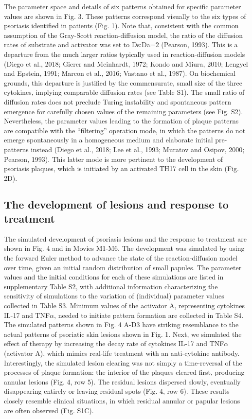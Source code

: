 The parameter space and details of six patterns obtained for specific parameter values are shown in Fig. 3. These patterns correspond visually to the six types of psoriasis identified in patients (Fig. 1). Note that, consistent with the common assumption of the Gray-Scott reaction-diffusion model, the ratio of the diffusion rates of substrate and activator was set to Ds:Da=2 (Pearson, 1993). This is a departure from the much larger ratios typically used in reaction-diffusion models (Diego et al., 2018; Gierer and Meinhardt, 1972; Kondo and Miura, 2010; Lengyel and Epstein, 1991; Marcon et al., 2016; Vastano et al., 1987). On biochemical grounds, this departure is justified by the commensurate, small size of the three cytokines, implying comparable diffusion rates (see Table S1). The small ratio of diffusion rates does not preclude Turing instability and spontaneous pattern emergence for carefully chosen values of the remaining parameters (see Fig. S2). Nevertheless, the  parameter values leading to the formation of plaque patterns are compatible with the ``filtering” operation mode, in which the patterns do not emerge spontaneously in a homogeneous medium and elaborate initial pre-patterns instead (Diego et al., 2018; Lee et al., 1993; Muratov and Osipov, 2000; Pearson, 1993). This latter mode is more pertinent to the development of psoriasis plaques, which is initiated by an activated TH17 cell in the skin (Fig. 2D). 

\subsection{The development of lesions and response to treatment}
The simulated development of psoriasis lesions and the response to treatment are shown in Fig. 4 and in  Movies M1-M6. The development was simulated by using the forward Euler method to advance the state of the reaction-diffusion model over time, given an initial random distribution of small papules. The parameter values and the initial conditions for each of these simulations are listed in supplementary Table S2, with additional information characterizing the sensitivity of simulations to the variation of (individual) parameter values collected in Table S3. Minimum values of the activator A, representing cytokines IL-17 and TNF$\alpha$, needed to initiate pattern formation are collected in Table S4. The simulated patterns shown in Fig. 4 A-D3 have striking resemblance to the actual patterns of psoriatic skin lesions shown in Fig. 1. Next, we simulated the effect of therapy by increasing the decay rate of cytokines IL-17 and TNF$\alpha$ (activator A), which mimics real-life treatment with an anti-cytokine antibody. Interestingly, the simulated lesion clearing was not simply a time-reversal of the processes of plaque formation: the interior of the plaques cleared first, producing annular lesions (Fig. 4, row 5). The residual lesions dispersed slowly, eventually disappearing entirely or leaving residual spots (Fig. 4, row 6). These results closely resemble clinical situations, in which residual annular or papular lesions are often observed (Fig. S1C). 

